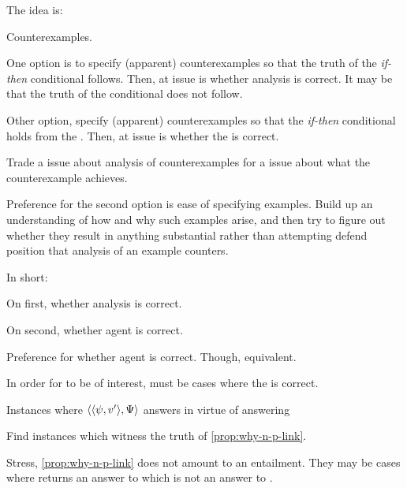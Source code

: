 \begin{note}
  The idea is:

  Counterexamples.

  One option is to specify (apparent) counterexamples so that the truth of the \emph{if-then} conditional follows.
  Then, at issue is whether analysis is correct.
  It may be that the truth of the conditional does not follow.

  Other option, specify (apparent) counterexamples so that the \emph{if-then} conditional holds from the \agpe{}.
  Then, at issue is whether the \agpe{} is correct.

  Trade a issue about analysis of counterexamples for a issue about what the counterexample achieves.

  Preference for the second option is ease of specifying examples.
  Build up an understanding of how and why such examples arise, and then try to figure out whether they result in anything substantial rather than attempting defend position that analysis of an example counters.

  In short:

  On first, whether analysis is correct.

  On second, whether agent is correct.

  Preference for whether agent is correct.
  Though, equivalent.
\end{note}

\begin{note}
  In order for \qWhyV{} to be of interest, must be cases where the \agpe{} is correct.

  \begin{proposition}
    \label{prop:why-n-p-link}
    Instances where \(\langle \langle \psi, v' \rangle, \Psi \rangle\) answers \qWhyVnP{} in virtue of answering \qWhyV{}
  \end{proposition}

  Find instances which witness the truth of \autoref{prop:why-n-p-link}.

  Stress, \autoref{prop:why-n-p-link} does not amount to an entailment.
  They may be cases where \agpe{} returns an answer to \qWhyV{} which is not an answer to \qWhyVnP{}.
\end{note}

\subsubsection{}
\label{sec:fc3}

